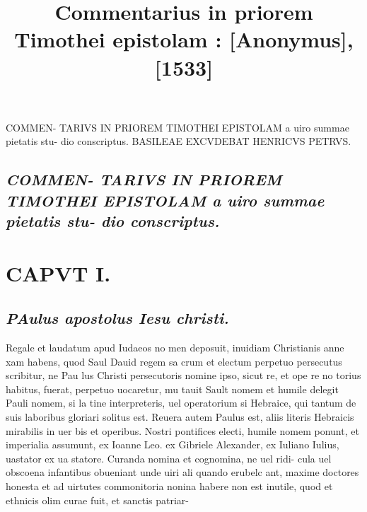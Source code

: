 \documentclass{article}
\begin{document}
\date{}
        \title{Commentarius in priorem Timothei epistolam : [Anonymus], [1533]}
\maketitle
\tableofcontents
\clearpage
\begin{pages} 
\beginnumbering
        \pstart COMMEN- TARIVS IN PRIOREM TIMOTHEI EPISTOLAM a uiro summae pietatis stu- dio conscriptus.  \pend\pstart BASILEAE EXCVDEBAT HENRICVS PETRVS.  \pend
\marginpar{[ p.3 ]}
{}
\subsection*{\textit{COMMEN- TARIVS IN PRIOREM TIMOTHEI EPISTOLAM a uiro summae pietatis stu- dio conscriptus. }}
\endnumbering\beginnumbering\section{CAPVT I.}
{}
\subsection*{\textit{\huge\textbf{P}\normalsize Aulus apostolus Iesu christi. }}\pstart Regale et laudatum apud Iudaeos no men deposuit, inuidiam Christianis anne xam habens, quod Saul Dauid regem sa crum et electum perpetuo persecutus scribitur, ne Pau lus Christi persecutoris nomine ipso, sicut re, et ope re no torius habitus, fuerat, perpetuo uocaretur, mu tauit Sault nomem et humile delegit Pauli nomem, si la tine interpreteris, uel operatorium si Hebraice, qui tantum de suis laboribus gloriari solitus est. Reuera autem Paulus est, aliis literis Hebraicis mirabilis in uer bis et operibus. Nostri pontifices electi, humile nomem ponunt, et imperialia assumunt, ex Ioanne Leo. ex Gibriele Alexander, ex Iuliano Iulius, uastator ex ua statore. Curanda nomina et cognomina, ne uel ridi- cula uel obscoena infantibus obueniant unde uiri ali quando erubelc ant, maxime doctores honesta et ad uirtutes commonitoria nonina habere non est inutile, quod et ethnicis olim curae fuit, et sanctis patriar-  \pend

\end{pages}
\end{document}
